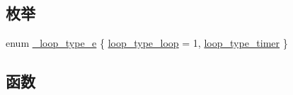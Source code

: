 \subsection*{枚举}
\begin{DoxyCompactItemize}
\item 
enum \hyperlink{a00099_a2583618f1d6afdd0085a96f59b45d9bd_a2583618f1d6afdd0085a96f59b45d9bd}{\+\_\+loop\+\_\+type\+\_\+e} \{ \hyperlink{a00099_a2583618f1d6afdd0085a96f59b45d9bd_a2583618f1d6afdd0085a96f59b45d9bda0451d8a119ce5fe669f2f2b454920dd4}{loop\+\_\+type\+\_\+loop} = 1, 
\hyperlink{a00099_a2583618f1d6afdd0085a96f59b45d9bd_a2583618f1d6afdd0085a96f59b45d9bda6b68505ad966bb72c76dfde12d79938f}{loop\+\_\+type\+\_\+timer}
 \}
\end{DoxyCompactItemize}
\subsection*{函数}
